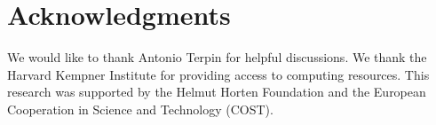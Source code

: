 \section*{Acknowledgments}
We would like to thank Antonio Terpin for helpful discussions.
We thank the Harvard Kempner Institute for providing access to computing resources.
This research was supported by the Helmut Horten Foundation and the European Cooperation in Science and Technology (COST).
